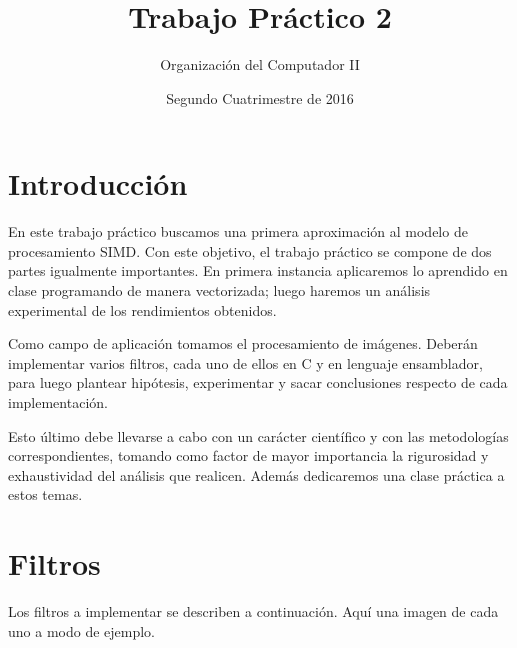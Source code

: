 \documentclass[a4paper, 12pt]{article}
\title{Trabajo Práctico 2}
\author{Organización del Computador II}
\date{Segundo Cuatrimestre de 2016}
\begin{document}
\renewcommand{\labelenumi}{\alph{enumi}$)$}
\maketitle


\section{Introducción}

En este trabajo práctico buscamos una primera aproximación al modelo de procesamiento SIMD. Con este objetivo, el trabajo práctico se compone de dos partes igualmente importantes. En primera instancia aplicaremos lo aprendido en clase programando de manera vectorizada; luego haremos un análisis experimental de los rendimientos obtenidos.

Como campo de aplicación tomamos el procesamiento de imágenes. Deberán implementar varios filtros, cada uno de ellos en C y en lenguaje ensamblador, para luego plantear hipótesis, experimentar y sacar conclusiones respecto de cada implementación.

Esto último debe llevarse a cabo con un carácter científico y con las metodologías correspondientes, tomando como factor de mayor importancia
la rigurosidad y exhaustividad del análisis que realicen.
Además dedicaremos una clase práctica a estos temas.

\section{Filtros}
\label{filtros}
Los filtros a implementar se describen a continuación.
Aquí una imagen de cada uno a modo de ejemplo.
\end{document}
